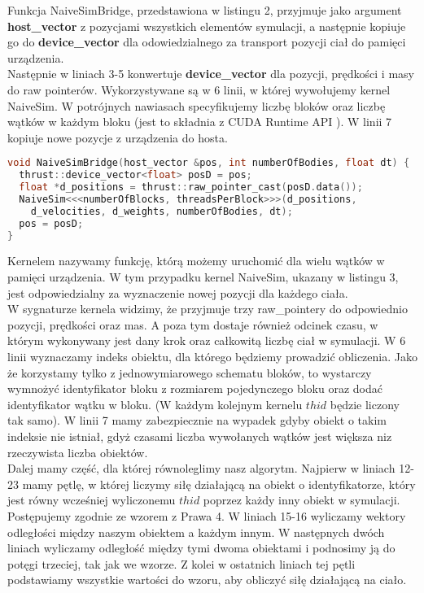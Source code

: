 \documentclass[14pt,twoside,a4paper]{article}
\theoremstyle{definition}
\begin{document}
Funkcja NaiveSimBridge, przedstawiona w listingu 2, przyjmuje jako argument \textbf{host\_vector} z pozycjami wszystkich elementów symulacji, a następnie kopiuje go do \textbf{device\_vector} dla odowiedzialnego za transport pozycji ciał do pamięci urządzenia. \\Następnie w liniach 3-5 konwertuje \textbf{device\_vector} dla pozycji, prędkości i masy do raw pointerów. Wykorzystywane są w 6 linii, w której wywołujemy kernel NaiveSim. W potrójnych nawiasach specyfikujemy liczbę bloków oraz liczbę wątków w każdym bloku (jest to składnia z CUDA Runtime API \cite{runtimeApi}). 
W linii 7 kopiuje nowe pozycje z urządzenia do hosta. 
\begin{lstlisting}[language=C++, frame=single, framerule=2pt, caption=Bridge pomiędzy główną pętlą a kernelem]
void NaiveSimBridge(host_vector &pos, int numberOfBodies, float dt) {
  thrust::device_vector<float> posD = pos;
  float *d_positions = thrust::raw_pointer_cast(posD.data());
  NaiveSim<<<numberOfBlocks, threadsPerBlock>>>(d_positions, 
  	d_velocities, d_weights, numberOfBodies, dt);
  pos = posD;
}
\end{lstlisting}
\bigskip
Kernelem nazywamy funkcję, którą możemy uruchomić dla wielu wątków w pamięci urządzenia. W tym przypadku kernel NaiveSim, ukazany w listingu 3, jest odpowiedzialny za wyznaczenie nowej pozycji dla każdego ciała. \\
W sygnaturze kernela widzimy, że przyjmuje trzy raw\_pointery do odpowiednio pozycji, prędkości oraz mas. A poza tym dostaje również  odcinek czasu, w którym wykonywany jest dany krok oraz całkowitą liczbę ciał w symulacji. W 6 linii wyznaczamy indeks obiektu, dla którego będziemy prowadzić obliczenia. Jako że korzystamy tylko z jednowymiarowego schematu bloków, to wystarczy wymnożyć identyfikator bloku z rozmiarem pojedynczego bloku oraz dodać identyfikator wątku w bloku. (W każdym kolejnym kernelu $thid$ będzie liczony tak samo).
W linii 7 mamy zabezpiecznie na wypadek gdyby obiekt o takim indeksie nie istniał, gdyż czasami liczba wywołanych wątków jest większa niz rzeczywista liczba obiektów. \\
Dalej mamy część, dla której równoleglimy nasz algorytm. Najpierw w liniach 12-23 mamy pętlę, w której liczymy siłę działającą na obiekt o identyfikatorze, który jest równy wcześniej wyliczonemu $thid$ poprzez każdy inny obiekt w symulacji. Postępujemy zgodnie ze wzorem z Prawa 4. W liniach 15-16 wyliczamy wektory odległości między naszym obiektem a każdym innym. W następnych dwóch liniach wyliczamy odległość między tymi dwoma obiektami i podnosimy ją do potęgi trzeciej, tak jak we wzorze. Z kolei w ostatnich liniach tej pętli podstawiamy wszystkie wartości do wzoru, aby obliczyć siłę działającą na ciało. \\
\end{document}
